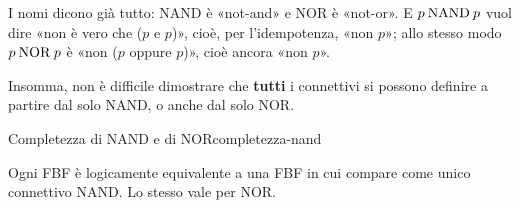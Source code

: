 \begin{spiegazione}
    I nomi dicono già tutto: NAND è «not-and» e NOR è «not-or». E $p \mathbin{\mathrm{NAND}} p$ vuol dire «non è vero che ($p$ e $p$)», cioè, per l'idempotenza, «non $p$»;
    allo stesso modo $p \mathbin{\mathrm{NOR}} p$ è «non ($p$ oppure $p$)», cioè ancora «non $p$».
\end{spiegazione}


Insomma, non è difficile dimostrare che \textbf{tutti} i connettivi si possono definire a partire dal solo NAND,
o anche dal solo NOR.

\begin{concetto}
\begin{Teorema}{Completezza di NAND e di NOR}{completezza-nand}
    \begin{prerequisiti}
    \end{prerequisiti}
    Ogni FBF è logicamente equivalente a una FBF in cui compare come unico connettivo NAND.
    Lo stesso vale per NOR.
\end{Teorema}


\end{concetto}
